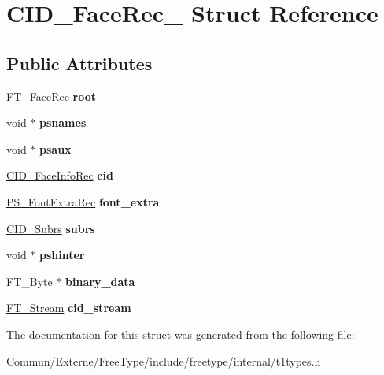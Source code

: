 \hypertarget{struct_c_i_d___face_rec__}{}\section{C\+I\+D\+\_\+\+Face\+Rec\+\_\+ Struct Reference}
\label{struct_c_i_d___face_rec__}
\subsection*{Public Attributes}
\begin{DoxyCompactItemize}
\item 
\hyperlink{struct_f_t___face_rec__}{F\+T\+\_\+\+Face\+Rec} {\bfseries root}\hypertarget{struct_c_i_d___face_rec___aeeb09d3feaa016b664e1c5bf95a6f232}{}\label{struct_c_i_d___face_rec___aeeb09d3feaa016b664e1c5bf95a6f232}

\item 
void $\ast$ {\bfseries psnames}\hypertarget{struct_c_i_d___face_rec___ab87e41e70c9aa0c32382ce43dda8b32a}{}\label{struct_c_i_d___face_rec___ab87e41e70c9aa0c32382ce43dda8b32a}

\item 
void $\ast$ {\bfseries psaux}\hypertarget{struct_c_i_d___face_rec___a8e8c0efc67577803cef0f73fc114470d}{}\label{struct_c_i_d___face_rec___a8e8c0efc67577803cef0f73fc114470d}

\item 
\hyperlink{struct_c_i_d___face_info_rec__}{C\+I\+D\+\_\+\+Face\+Info\+Rec} {\bfseries cid}\hypertarget{struct_c_i_d___face_rec___a00bc02f259a47704eb471d38c573bd4c}{}\label{struct_c_i_d___face_rec___a00bc02f259a47704eb471d38c573bd4c}

\item 
\hyperlink{struct_p_s___font_extra_rec__}{P\+S\+\_\+\+Font\+Extra\+Rec} {\bfseries font\+\_\+extra}\hypertarget{struct_c_i_d___face_rec___aba208398d42242870890625f993caa81}{}\label{struct_c_i_d___face_rec___aba208398d42242870890625f993caa81}

\item 
\hyperlink{struct_c_i_d___subrs_rec__}{C\+I\+D\+\_\+\+Subrs} {\bfseries subrs}\hypertarget{struct_c_i_d___face_rec___aa842e3eb5a5092dd0fc2c0ecf7bd692b}{}\label{struct_c_i_d___face_rec___aa842e3eb5a5092dd0fc2c0ecf7bd692b}

\item 
void $\ast$ {\bfseries pshinter}\hypertarget{struct_c_i_d___face_rec___a8a367e497f72f4d0384103952d73fc08}{}\label{struct_c_i_d___face_rec___a8a367e497f72f4d0384103952d73fc08}

\item 
F\+T\+\_\+\+Byte $\ast$ {\bfseries binary\+\_\+data}\hypertarget{struct_c_i_d___face_rec___a42f458adc70ad63807dbe63b8b694da2}{}\label{struct_c_i_d___face_rec___a42f458adc70ad63807dbe63b8b694da2}

\item 
\hyperlink{struct_f_t___stream_rec__}{F\+T\+\_\+\+Stream} {\bfseries cid\+\_\+stream}\hypertarget{struct_c_i_d___face_rec___a2be5991aa14a8f599c02b1cdfc547e25}{}\label{struct_c_i_d___face_rec___a2be5991aa14a8f599c02b1cdfc547e25}

\end{DoxyCompactItemize}


The documentation for this struct was generated from the following file\+:\begin{DoxyCompactItemize}
\item 
Commun/\+Externe/\+Free\+Type/include/freetype/internal/t1types.\+h\end{DoxyCompactItemize}
